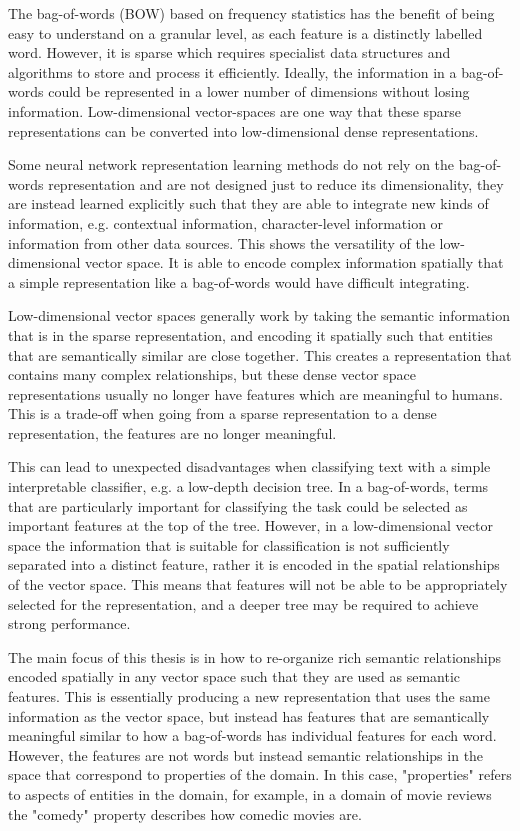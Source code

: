 The bag-of-words (BOW) based on frequency statistics has the benefit of being easy to understand on a granular level, as each feature is a distinctly labelled word. However, it is sparse which requires specialist data structures and algorithms to store and process it efficiently. Ideally, the  information in a bag-of-words could be represented in a lower number of dimensions without losing information. Low-dimensional vector-spaces are one way that these sparse representations can be converted into low-dimensional dense representations. 

Some neural network representation learning methods do not rely on the bag-of-words representation and are not designed just to reduce its dimensionality, they are instead learned explicitly such that they are able to integrate new kinds of information, e.g. contextual information, character-level information or information from other data sources. This shows the versatility of the low-dimensional vector space. It is able to encode complex information spatially that a simple representation like a bag-of-words would have difficult integrating.

Low-dimensional vector spaces generally work by taking the semantic information that is in the sparse representation, and encoding it spatially such that entities that are semantically similar are close together. This creates a representation that contains many complex relationships, but these dense vector space representations usually no longer have features which are meaningful to humans. This is a trade-off when going from a sparse representation to a dense representation, the features are no longer meaningful. 

This can lead to unexpected disadvantages when classifying text with a simple interpretable classifier, e.g. a low-depth decision tree. In a bag-of-words, terms that are particularly important for classifying the task could be selected as important features at the top of the tree. However, in a low-dimensional vector space the information that is suitable for classification is not sufficiently separated into a distinct feature, rather it is encoded in the spatial relationships of the vector space. This means that features will not be able to be appropriately selected for the representation, and a deeper tree may be required to achieve strong performance.

The main focus of this thesis is in how to re-organize rich semantic relationships encoded spatially in any vector space  such that they are used as semantic features. This is essentially producing a new representation that uses the same information as the vector space, but instead has features that are semantically meaningful similar to how a bag-of-words has individual features for each word. However, the features are not words but instead semantic relationships in the space that correspond to properties of the domain. In this case, "properties" refers to aspects of entities in the domain, for example, in a domain of movie reviews the "comedy" property describes how comedic movies are.



